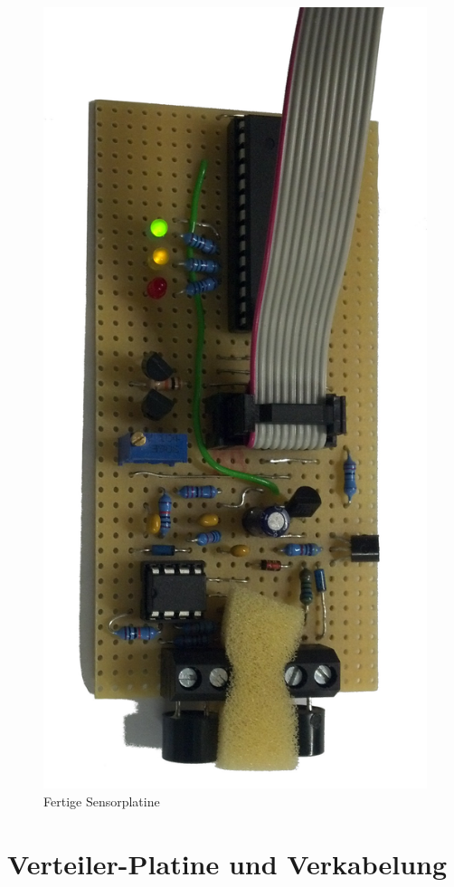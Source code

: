 \begin{figure}[H]
	\centering
	\includegraphics[angle=270, width=(\textwidth)]{fotos/platine_klein2.jpg}
	\caption{Fertige Sensorplatine} \label{img:endplatine_real}
\end{figure}


\section{Verteiler-Platine und Verkabelung}



